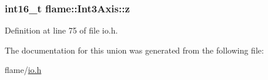 \hypertarget{unionflame_1_1_int3_axis_a07fa76bf97419e5fd100872978ab2a56}{
\subsubsection[{z}]{\setlength{\rightskip}{0pt plus 5cm}int16\-\_\-t flame\-::\-Int3\-Axis\-::z}}\label{unionflame_1_1_int3_axis_a07fa76bf97419e5fd100872978ab2a56}


Definition at line 75 of file io.\-h.



The documentation for this union was generated from the following file\-:\begin{DoxyCompactItemize}
\item 
flame/\hyperlink{io_8h}{io.\-h}\end{DoxyCompactItemize}
